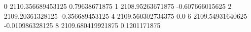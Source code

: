 0 2110.356689453125 0.79638671875
1 2108.95263671875 -0.607666015625
2 2109.20361328125 -0.356689453125
4 2109.560302734375 0.0
6 2109.54931640625 -0.010986328125
8 2109.680419921875 0.1201171875
